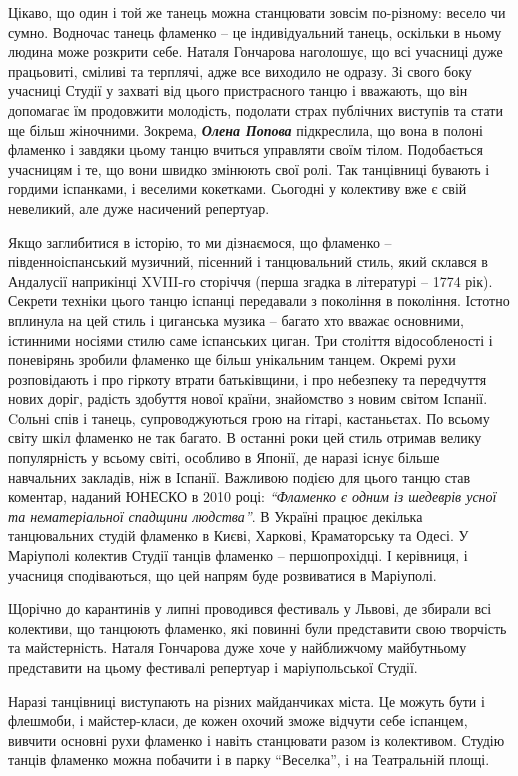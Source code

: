 Цікаво, що один і той же танець
можна станцювати зовсім по-різному: весело чи сумно. Водночас танець фламенко –
це індивідуальний танець, оскільки в ньому людина може розкрити себе. Наталя
Гончарова наголошує, що всі учасниці дуже працьовиті, сміливі та терплячі, адже
все виходило не одразу. Зі свого боку учасниці Студії у захваті від цього
пристрасного танцю і вважають, що він допомагає їм продовжити молодість,
подолати страх публічних виступів та стати ще більш жіночними. Зокрема, \emph{\textbf{Олена
Попова}} підкреслила, що вона в полоні фламенко і завдяки цьому танцю вчиться
управляти своїм тілом. Подобається учасницям і те, що вони швидко змінюють свої
ролі. Так танцівниці бувають і гордими іспанками, і веселими кокетками.
Сьогодні у колективу вже є свій невеликий, але дуже насичений репертуар.


Якщо заглибитися в історію, то ми дізнаємося, що фламенко – південноіспанський
музичний, пісенний і танцювальний стиль, який склався в Андалусії наприкінці
XVIII-го сторіччя  (перша згадка в літературі – 1774 рік). Секрети техніки
цього танцю іспанці передавали з покоління в покоління. Істотно вплинула на цей
стиль і циганська музика – багато хто вважає основними, істинними носіями стилю
саме іспанських циган. Три століття відособленості і поневірянь зробили
фламенко ще більш унікальним танцем. Окремі рухи розповідають і про гіркоту
втрати батьківщини, і про небезпеку та передчуття нових доріг, радість здобуття
нової країни, знайомство з новим світом Іспанії. Cольні спів і танець,
супроводжуються грою на гітарі, кастаньєтах. По всьому світу шкіл фламенко не
так багато. В останні роки цей стиль отримав велику популярність у всьому
світі, особливо в Японії, де наразі існує більше навчальних закладів, ніж в
Іспанії. Важливою подією для цього танцю став коментар, наданий ЮНЕСКО в 2010
році: \emph{\enquote{Фламенко є одним із шедеврів усної та нематеріальної спадщини людства}}.
В Україні працює декілька танцювальних студій фламенко в Києві, Харкові,
Краматорську та Одесі. У Маріуполі колектив Студії танців фламенко –
першопрохідці. І керівниця, і учасниця сподіваються, що цей напрям буде
розвиватися в Маріуполі.


Щорічно до карантинів у липні проводився фестиваль у Львові, де збирали всі
колективи, що танцюють фламенко, які повинні були представити свою творчість та
майстерність. Наталя Гончарова дуже хоче у найближчому майбутньому представити
на цьому фестивалі репертуар і маріупольської Студії.

Наразі танцівниці виступають на різних майданчиках міста. Це можуть бути і
флешмоби, і майстер-класи, де кожен охочий зможе відчути себе іспанцем, вивчити
основні рухи фламенко і навіть станцювати разом із колективом. Студію танців
фламенко можна побачити і в парку \enquote{Веселка}, і на Театральній площі.
